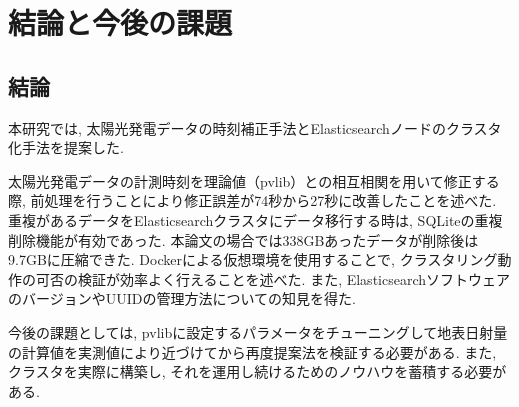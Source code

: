 \chapter{結論と今後の課題}
\label{chap:fifth}

\section{結論}




本研究では, 太陽光発電データの時刻補正手法とElasticsearchノードのクラスタ化手法を提案した.

太陽光発電データの計測時刻を理論値（pvlib）との相互相関を用いて修正する際, 前処理を行うことにより修正誤差が74秒から27秒に改善したことを述べた. 重複があるデータをElasticsearchクラスタにデータ移行する時は, SQLiteの重複削除機能が有効であった. 本論文の場合では338GBあったデータが削除後は9.7GBに圧縮できた.  Dockerによる仮想環境を使用することで, クラスタリング動作の可否の検証が効率よく行えることを述べた. また, ElasticsearchソフトウェアのバージョンやUUIDの管理方法についての知見を得た.

今後の課題としては, pvlibに設定するパラメータをチューニングして地表日射量の計算値を実測値により近づけてから再度提案法を検証する必要がある. また, クラスタを実際に構築し, それを運用し続けるためのノウハウを蓄積する必要がある.

